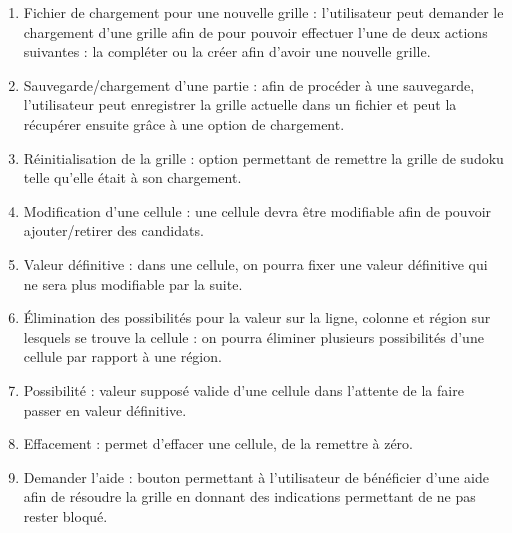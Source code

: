 \begin{enumerate}
  
  \item Fichier de chargement pour une nouvelle grille :
  l'utilisateur peut demander le chargement d'une grille afin 
  de pour pouvoir effectuer l'une de deux actions suivantes : 
  la compléter ou la créer afin d'avoir une nouvelle grille. \\
  
  \item Sauvegarde/chargement d’une partie :
  afin de procéder à une sauvegarde, l'utilisateur peut enregistrer la grille actuelle 
  dans un fichier et peut la récupérer ensuite grâce à une option de chargement. \\
  
  \item Réinitialisation de la grille :
  option permettant de remettre la grille de sudoku telle qu'elle était à son chargement. \\
  
  \item Modification d’une cellule :
  une cellule devra être modifiable afin de pouvoir ajouter/retirer des candidats. \\
  
  \item Valeur définitive :
  dans une cellule, on pourra fixer une valeur définitive qui ne sera plus modifiable par la suite. \\
  
  \item Élimination des possibilités pour la valeur sur la ligne, colonne et
  région sur lesquels se trouve la cellule :
  on pourra éliminer plusieurs possibilités d'une cellule par rapport à une région. \\
  
  \item Possibilité : valeur supposé valide d'une cellule dans l'attente de la faire passer en valeur définitive. \\
  
  \item Effacement : permet d'effacer une cellule, de la remettre à zéro. \\
  
  \item Demander l’aide : bouton permettant à l'utilisateur de bénéficier d'une aide 
  afin de résoudre la grille en donnant des indications permettant de ne pas rester bloqué. \\
  

\end{enumerate}
